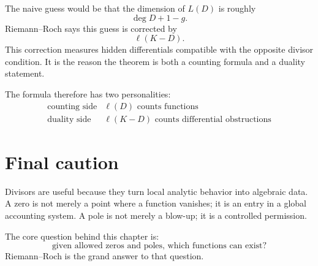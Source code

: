 The naive guess would be that the dimension of \(L(D)\) is roughly
\[
  \deg D+1-g.
\]
Riemann--Roch says this guess is corrected by
\[
  \ell(K-D).
\]
This correction measures hidden differentials compatible with the opposite divisor condition.  It is the reason the theorem is both a counting formula and a duality statement.

The formula therefore has two personalities:
\[
\begin{array}{c|c}
\text{counting side} & \ell(D)\text{ counts functions}\\
\text{duality side} & \ell(K-D)\text{ counts differential obstructions}
\end{array}
\]

\section{Final caution}

Divisors are useful because they turn local analytic behavior into algebraic data. A zero is not merely a point where a function vanishes; it is an entry in a global accounting system. A pole is not merely a blow-up; it is a controlled permission.

The core question behind this chapter is:
\[
  \text{given allowed zeros and poles, which functions can exist?}
\]
Riemann--Roch is the grand answer to that question.
